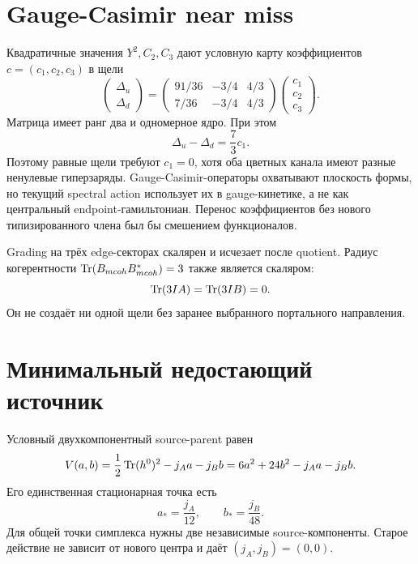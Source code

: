 \section{Gauge-Casimir near miss}

Квадратичные значения $Y^2,C_2,C_3$ дают условную карту коэффициентов
$c=(c_1,c_2,c_3)$ в щели
\begin{equation}
 \begin{pmatrix}\Delta_u\\\Delta_d\end{pmatrix}
 =\begin{pmatrix}
 91/36&-3/4&4/3\\
 7/36&-3/4&4/3
 \end{pmatrix}
 \begin{pmatrix}c_1\\c_2\\c_3\end{pmatrix}.
 \label{eq:v8-extra-mass-origin-gauge-map}
\end{equation}
Матрица имеет ранг два и одномерное ядро. При этом
\begin{equation}
 \Delta_u-\Delta_d=\frac73c_1.
 \label{eq:v8-extra-mass-origin-hypercharge-splitting}
\end{equation}
Поэтому равные щели требуют $c_1=0$, хотя оба цветных канала имеют разные
ненулевые гиперзаряды. Gauge-Casimir-операторы охватывают плоскость формы,
но текущий spectral action использует их в gauge-кинетике, а не как
центральный endpoint-гамильтониан. Перенос коэффициентов без нового
типизированного члена был бы смешением функционалов.

Grading на трёх edge-секторах скалярен и исчезает после quotient. Радиус
когерентности $\operatorname{Tr}(B_{
m coh}B_{
m coh}^*)=3$ также является скаляром:
\begin{equation}
 \operatorname{Tr}(3IA)=\operatorname{Tr}(3IB)=0.
 \label{eq:v8-extra-mass-origin-coherence-zero}
\end{equation}
Он не создаёт ни одной щели без заранее выбранного портального направления.

\section{Минимальный недостающий источник}

Условный двухкомпонентный source-parent равен
\begin{equation}
 V(a,b)=\frac12\operatorname{Tr}(h^0)^2-j_Aa-j_Bb
 =6a^2+24b^2-j_Aa-j_Bb.
 \label{eq:v8-extra-mass-origin-source-preview}
\end{equation}
Его единственная стационарная точка есть
\begin{equation}
 a_*=\frac{j_A}{12},\qquad b_*=\frac{j_B}{48}.
 \label{eq:v8-extra-mass-origin-source-stationary}
\end{equation}
Для общей точки симплекса нужны две независимые source-компоненты. Старое
действие не зависит от нового центра и даёт $(j_A,j_B)=(0,0)$.

